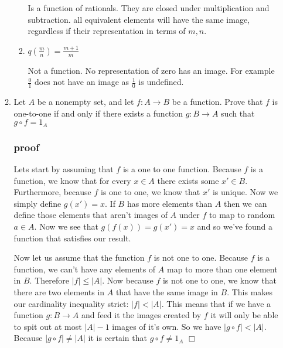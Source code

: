 \documentclass[letterpaper]{article}
\begin{document}
\begin{enumerate}
\begin{enumerate}
\begin{enumerate}
Is a function of rationals. They are closed under multiplication and subtraction. all equivalent elements will have the same image, regardless if their representation in terms of $m,n$.
\item
$\displaystyle q\left(\frac{m}{n}\right)=\frac{m+1}{m}$

Not a function. No representation of zero has an image. For example $\frac{0}{1}$ does not have an image as $\frac{1}{0}$ is undefined.
\end{enumerate}
\setcounter{enumii}{17}
\item
Let $A$ be a nonempty set, and let $f:A\to B$ be a function. Prove that $f$ is one-to-one if and only if there exists a function $g:B\to A$ such that $g\circ f=1_A$
\subsubsection*{proof}
Lets start by assuming that $f$ is a one to one function. Because $f$ is a function, we know that for every $x\in A$ there exists some $x'\in B$. Furthermore, because $f$ is one to one, we know that $x'$ is unique. Now we simply define $g(x')=x$. If $B$ has more elements than $A$ then we can define those elements that aren't images of $A$ under $f$ to map to random $a\in A$. Now we see that $g(f(x))=g(x')=x$ and so we've found a function that satisfies our result.

Now let us assume that the function $f$ is not one to one. Because $f$ is a function, we can't have any elements of $A$ map to more than one element in $B$. Therefore $\left\lvert f\right\rvert\le \left\lvert A\right\rvert$. Now because $f$ is not one to one, we know that there are two elements in $A$ that have the same image in $B$. This makes our cardinality inequality strict: $\left\lvert f\right\rvert<\left\lvert A\right\rvert$. This means that if we have a function $g:B\to A$ and feed it the images created by $f$ it will only be able to spit out at most $\left\lvert A\right\rvert-1$ images of it's own. So we have $\left\lvert g\circ f\right\rvert<\left\lvert A\right\rvert$. Because $\left\lvert g\circ f\right\rvert\ne\left\lvert A\right\rvert$ it is certain that $g\circ f\ne1_A$
$\Box$
\end{enumerate}
\end{enumerate}
\end{document}
